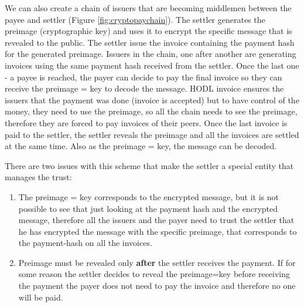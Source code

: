 \documentclass{article}
\begin{document}
We can also create a chain of issuers that are becoming middlemen between the payee and settler (Figure \ref{fig:cryptopaychain}). The settler generates the preimage (cryptographic key) and uses it to encrypt the specific message that is revealed to the public. The settler issue the invoice containing the payment hash for the generated preimage. Issuers in the chain, one after another are generating invoices using the same payment hash received from the settler. Once the last one - a payee is reached, the payer can decide to pay the final invoice so they can receive the preimage = key to decode the message. HODL invoice ensures the issuers that the payment was done (invoice is accepted) but to have control of the money, they need to use the preimage, so all the chain needs to see the preimage, therefore they are forced to pay invoices of their peers. Once the last invoice is paid to the settler, the settler reveals the preimage and all the invoices are settled at the same time. Also as the preimage = key, the message can be decoded.

There are two issues with this scheme that make the settler a special entity that manages the trust:
\begin{enumerate}
	\item The preimage = key corresponds to the encrypted message, but it is not possible to see that just looking at the payment hash and the encrypted message, therefore all the issuers and the payer need to trust the settler that he has encrypted the message with the specific preimage, that corresponds to the payment-hash on all the invoices.
	\item Preimage must be revealed only \textbf{after} the settler receives the payment. If for some reason the settler decides to reveal the preimage=key before receiving the payment the payer does not need to pay the invoice and therefore no one will be paid.
\end{enumerate}
\end{document}
